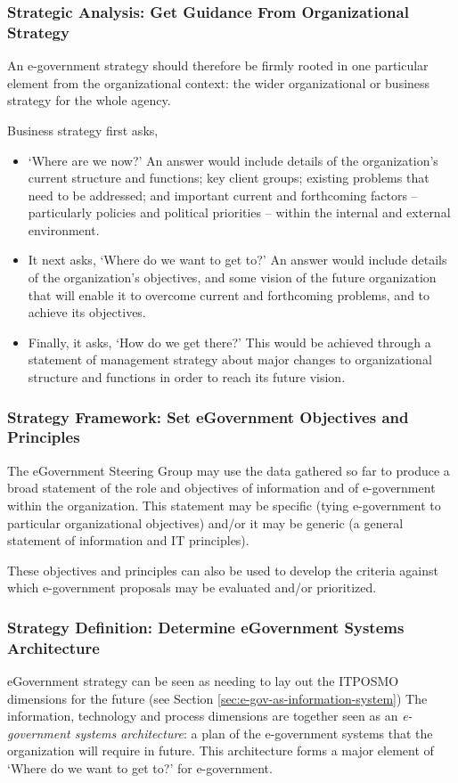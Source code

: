 \subsubsection{Strategic Analysis: Get Guidance From Organizational Strategy}
An e-government strategy should therefore be firmly rooted in one particular element from the organizational context: the wider organizational or business strategy for the whole agency.

Business strategy first asks, 
\begin{itemize}
	\item `Where are we now?’ An answer	would include details of the organization’s	current structure and functions; key client	groups; existing problems that need to be addressed; and important current and forthcoming factors – particularly policies and political priorities – within the internal and
	external environment.
	
	\item It next asks, `Where do we want to get to?’ An answer would include details of the organization’s objectives, and some vision
	of the future organization that will enable it to overcome current and forthcoming problems, and to achieve its objectives.
	
	\item Finally, it asks, `How do we get there?’ This would be achieved through a statement of management strategy about major changes to
	organizational structure and functions in order to reach its future vision.
\end{itemize}

\subsubsection{Strategy Framework: Set eGovernment Objectives and Principles}
The eGovernment Steering Group may use the data gathered so far to produce a broad statement of the role and objectives of information and of e-government within
the organization. This statement may be specific (tying e-government to particular organizational objectives) and/or it may be generic (a general statement of information
and IT principles). 


These objectives and principles can also be used to develop the criteria against which e-government proposals may be evaluated and/or prioritized.


\subsubsection{Strategy Definition: Determine eGovernment Systems Architecture}
eGovernment strategy can be seen as needing to lay out the ITPOSMO dimensions for the future (see Section \ref{sec:e-gov-as-information-system}) The information,
technology and process dimensions are
together seen as an \textit{e-government systems architecture}: a plan of the e-government systems that the organization will require in
future. This architecture forms a major element of ‘Where do we want to get to?’ for
e-government.



